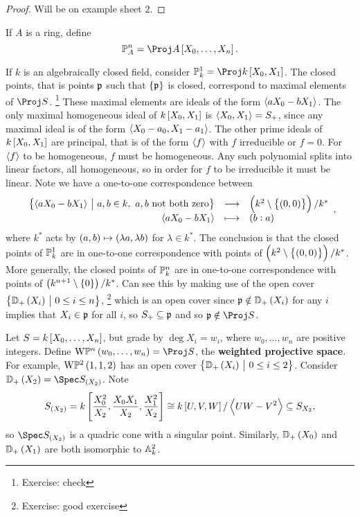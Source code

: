 \begin{proof}
Will be on example sheet $ 2 $.
\end{proof}

\begin{definition*}
If $ A $ is a ring, define
$$ \PP_A^n = \Proj A\sbr{X_0, \dots, X_n}. $$
\end{definition*}

\begin{example*}
If $ k $ is an algebraically closed field, consider $ \PP_k^1 = \Proj k\sbr{X_0, X_1} $. The closed points, that is points $ \ppp $ such that $ \cbr{\ppp} $ is closed, correspond to maximal elements of $ \Proj S $. \footnote{Exercise: check} These maximal elements are ideals of the form $ \abr{aX_0 - bX_1} $. The only maximal homogeneous ideal of $ k\sbr{X_0, X_1} $ is $ \abr{X_0, X_1} = S_+ $, since any maximal ideal is of the form $ \abr{X_0 - a_0, X_1 - a_1} $. The other prime ideals of $ k\sbr{X_0, X_1} $ are principal, that is of the form $ \abr{f} $ with $ f $ irreducible or $ f = 0 $. For $ \abr{f} $ to be homogeneous, $ f $ must be homogeneous. Any such polynomial splits into linear factors, all homogeneous, so in order for $ f $ to be irreducible it must be linear. Note we have a one-to-one correspondence between
$$ \function{\cbr{\abr{aX_0 - bX_1} \st a, b \in k, \ a, b \ \text{not both zero}}}{\br{k^2 \setminus \cbr{\br{0, 0}}} / k^*}{\abr{aX_0 - bX_1}}{\br{b : a}}, $$
where $ k^* $ acts by $ \br{a, b} \mapsto \br{\lambda a, \lambda b} $ for $ \lambda \in k^* $. The conclusion is that the closed points of $ \PP_k^1 $ are in one-to-one correspondence with points of $ \br{k^2 \setminus \cbr{\br{0, 0}}} / k^* $. More generally, the closed points of $ \PP_k^n $ are in one-to-one correspondence with points of $ \br{k^{n + 1} \setminus \cbr{0}} / k^* $. Can see this by making use of the open cover $ \cbr{\DD_+\br{X_i} \st 0 \le i \le n} $, \footnote{Exercise: good exercise} which is an open cover since $ \ppp \notin \DD_+\br{X_i} $ for any $ i $ implies that $ X_i \in \ppp $ for all $ i $, so $ S_+ \subseteq \ppp $ and so $ \ppp \notin \Proj S $.
\end{example*}

\begin{example*}
Let $ S = k\sbr{X_0, \dots, X_n} $, but grade by $ \deg X_i = w_i $, where $ w_0, \dots, w_n $ are positive integers. Define $ \W\PP^n\br{w_0, \dots, w_n} = \Proj S $, the \textbf{weighted projective space}. For example, $ \W\PP^2\br{1, 1, 2} $ has an open cover $ \cbr{\DD_+\br{X_i} \st 0 \le i \le 2} $. Consider $ \DD_+\br{X_2} = \Spec S_{\br{X_2}} $. Note
$$ S_{\br{X_2}} = k\sbr{\dfrac{X_0^2}{X_2}, \dfrac{X_0X_1}{X_2}, \dfrac{X_1^2}{X_2}} \cong k\sbr{U, V, W} / \abr{UW - V^2} \subseteq S_{X_2}, $$
so $ \Spec S_{\br{X_2}} $ is a quadric cone with a singular point. Similarly, $ \DD_+\br{X_0} $ and $ \DD_+\br{X_1} $ are both isomorphic to $ \AA_k^2 $.
\end{example*}

